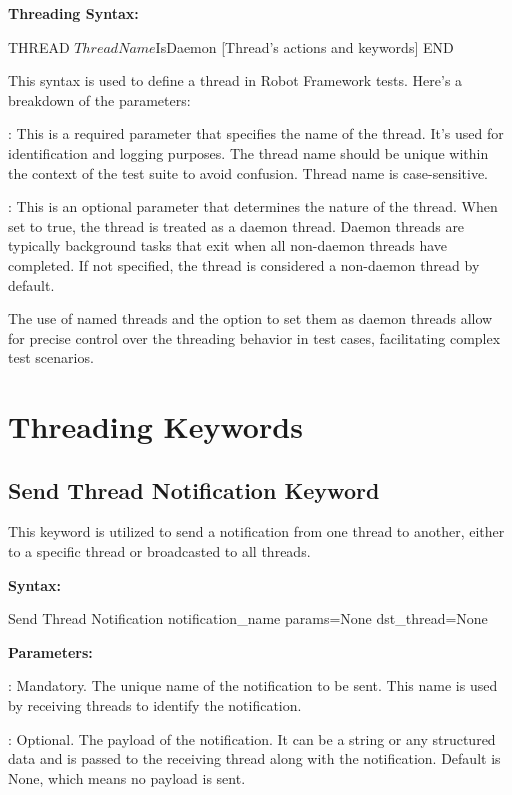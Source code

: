 \textbf{Threading Syntax:}

\begin{robotcode}
THREAD    ${ThreadName}     ${IsDaemon}
       [Thread's actions and keywords]
END
\end{robotcode}

This syntax is used to define a thread in Robot Framework tests. Here's a breakdown of the parameters:

: This is a required parameter that specifies the name of the thread. It's used for identification and logging purposes. The thread name should be unique within the context of the test suite to avoid confusion. Thread name is case-sensitive.

: This is an optional parameter that determines the nature of the thread. When set to true, the thread is treated as a daemon thread. Daemon threads are typically background tasks that exit when all non-daemon threads have completed. If not specified, the thread is considered a non-daemon thread by default.

The use of named threads and the option to set them as daemon threads allow for precise control over the threading behavior in test cases, facilitating complex test scenarios.

\section{Threading Keywords}

\subsection{Send Thread Notification Keyword}

This keyword is utilized to send a notification from one thread to another, either to a specific thread or broadcasted to all threads.

\textbf{Syntax:}

\begin{robotcode}
Send Thread Notification    notification_name    params=None     dst_thread=None
\end{robotcode}

\textbf{Parameters:}

: Mandatory. The unique name of the notification to be sent. This name is used by receiving threads to identify the notification.

: Optional. The payload of the notification. It can be a string or any structured data and is passed to the receiving thread along with the notification. Default is None, which means no payload is sent.

